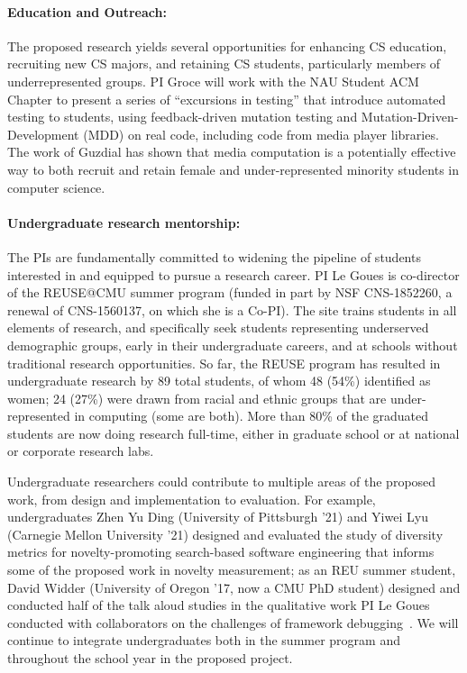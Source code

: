 \paragraph{Education and Outreach:}
The proposed research yields several opportunities for enhancing CS
education, recruiting new CS majors, and retaining CS students,
particularly members of underrepresented groups.  
PI Groce will work with the NAU Student ACM Chapter to present a
series of ``excursions in testing'' that introduce automated testing
to students, using feedback-driven mutation testing and Mutation-Driven-Development (MDD) on real code, including code from
media player libraries.  The work of Guzdial
\cite{Guzdial} has shown that media computation is a
potentially effective way to both recruit and retain female and
under-represented minority students in computer science.

\paragraph{Undergraduate research mentorship:} 
The PIs are fundamentally committed to widening the pipeline of students
interested in and equipped to pursue a research career. PI Le Goues is
co-director of the REUSE@CMU summer program (funded in part by NSF CNS-1852260,
a renewal of CNS-1560137, on which she is a Co-PI). The site trains students in
all elements of research, and specifically seek students representing
underserved demographic groups, early in their undergraduate careers, and at
schools without traditional research opportunities.  So far, the REUSE program
has resulted in undergraduate research by 89 total students, of whom 48 (54\%)
identified as women; 24 (27\%) were drawn from racial and ethnic groups that are
under-represented in computing (some are both). More than 80\% of the graduated
students are now doing research full-time, either in graduate school or at
national or corporate research labs.

Undergraduate researchers could contribute to multiple areas of the proposed
work, from design and implementation to evaluation. For example, undergraduates
Zhen Yu Ding (University of Pittsburgh '21) and Yiwei Lyu (Carnegie Mellon
University '21) designed and evaluated the study of diversity metrics for
novelty-promoting search-based software engineering that informs some of the
proposed work in novelty measurement; as an REU summer student, David Widder
(University of Oregon '17, now a CMU PhD student) designed and conducted half of
the talk aloud studies in the qualitative work PI Le Goues conducted with
collaborators on the challenges of framework
debugging~\cite{frameworkDebugging}.  We will continue to integrate
undergraduates both in the summer program and throughout the school year in the
proposed project.
